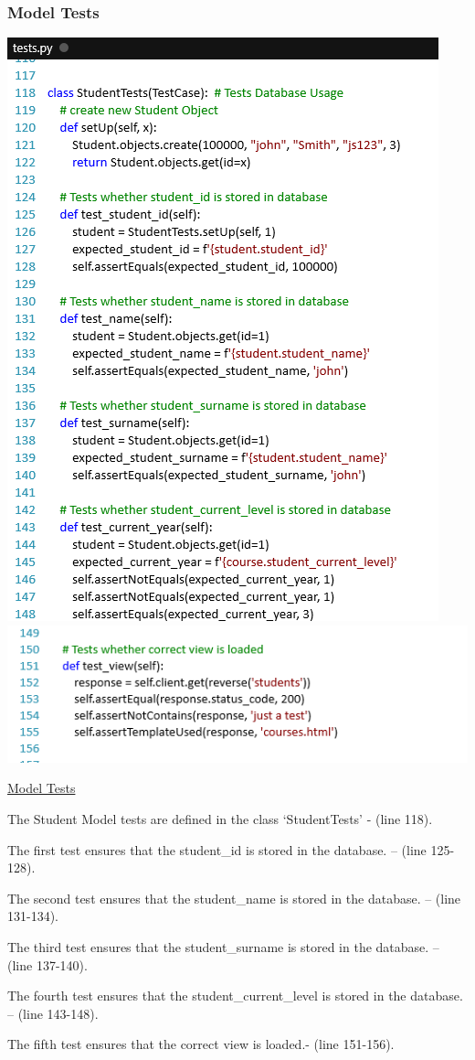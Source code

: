 \documentclass[10pt]{article}
\begin{document}
\subsubsection{Model Tests}

\begin{center}
\includegraphics[width=.8\textwidth]{model_1.png}
\includegraphics[width=.8\textwidth]{model_2.png}
\end{center}
\caption{\underline{Model Tests}}

\begin{description}[font=$\bullet$~\normalfont\scshape\color{red!50!black}]

\item [] The Student Model tests are defined in the class ‘StudentTests’ - (line 118).
\item [] The first test ensures that the student\_id is stored in the database. – (line 125-128).
\item [] The second test ensures that the student\_name is stored in the database. – (line 131-134).
\item [] The third test ensures that the student\_surname is stored in the database. – (line 137-140).
\item [] The fourth test ensures that the student\_current\_level is stored in the database. – (line 143-148).
\item [] The fifth test ensures that the correct view is loaded.- (line 151-156).

\end{description}
\end{document}
